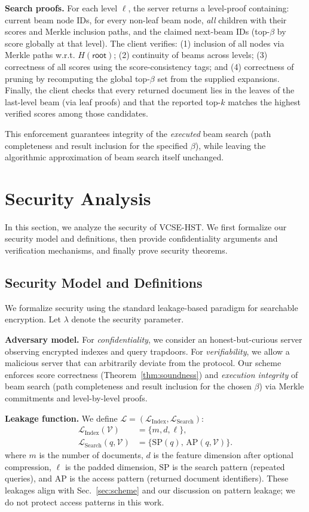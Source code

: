 \documentclass[journal]{IEEEtran}
\begin{document}
\textbf{Search proofs.} For each level $\ell$, the server returns a level-proof containing: current beam node IDs, for every non-leaf beam node, \emph{all} children with their scores and Merkle inclusion paths, and the claimed next-beam IDs (top-$\beta$ by score globally at that level). The client verifies: (1) inclusion of all nodes via Merkle paths w.r.t. $H(\textsf{root})$; (2) continuity of beams across levels; (3) correctness of all scores using the score-consistency tags; and (4) correctness of pruning by recomputing the global top-$\beta$ set from the supplied expansions. Finally, the client checks that every returned document lies in the leaves of the last-level beam (via leaf proofs) and that the reported top-$k$ matches the highest verified scores among those candidates.

This enforcement guarantees integrity of the \emph{executed} beam search (path completeness and result inclusion for the specified $\beta$), while leaving the algorithmic approximation of beam search itself unchanged.

\section{Security Analysis}
\label{sec:security}

In this section, we analyze the security of VCSE-HST. We first formalize our security model and definitions, then provide confidentiality arguments and verification mechanisms, and finally prove security theorems.

\subsection{Security Model and Definitions}

We formalize security using the standard leakage-based paradigm for searchable encryption. Let $\lambda$ denote the security parameter.

\textbf{Adversary model.} For \emph{confidentiality}, we consider an honest-but-curious server observing encrypted indexes and query trapdoors. For \emph{verifiability}, we allow a malicious server that can arbitrarily deviate from the protocol. Our scheme enforces score correctness (Theorem~\ref{thm:soundness}) and \emph{execution integrity} of beam search (path completeness and result inclusion for the chosen $\beta$) via Merkle commitments and level-by-level proofs.

\textbf{Leakage function.} We define $\mathcal{L}=(\mathcal{L}_{\mathrm{Index}},\mathcal{L}_{\mathrm{Search}})$:
\begin{align*}
\mathcal{L}_{\mathrm{Index}}(\mathcal{V}) &=\{m, d, \ell\}, \\
\mathcal{L}_{\mathrm{Search}}(q,\mathcal{V}) &=\{\mathrm{SP}(q),\,\mathrm{AP}(q,\mathcal{V})\}.
\end{align*}
where $m$ is the number of documents, $d$ is the feature dimension after optional compression, $\ell$ is the padded dimension, $\mathrm{SP}$ is the search pattern (repeated queries), and $\mathrm{AP}$ is the access pattern (returned document identifiers). These leakages align with Sec.~\ref{sec:scheme} and our discussion on pattern leakage; we do not protect access patterns in this work.
\end{document}
